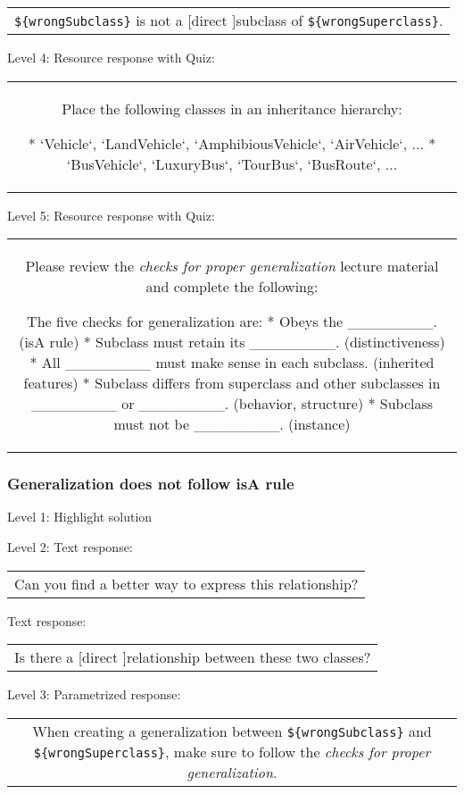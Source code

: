 \begin{tabular}{|c}
\verb|${wrongSubclass}| is not a [direct ]subclass of \verb|${wrongSuperclass}|.
\end{tabular} \medskip

\noindent Level 4: Resource response with Quiz:

\begin{tabular}{|c}
Place the following classes in an inheritance hierarchy:

* `Vehicle`, `LandVehicle`, `AmphibiousVehicle`, `AirVehicle`, ...
* `BusVehicle`, `LuxuryBus`, `TourBus`, `BusRoute`, ...
\end{tabular} \medskip

\noindent Level 5: Resource response with Quiz:

\begin{tabular}{|c}
Please review the \textit{checks for proper generalization} lecture material
and complete the following:

The five checks for generalization are:
* Obeys the ________. (isA rule)
* Subclass must retain its ________. (distinctiveness)
* All ________ must make sense in each subclass. (inherited features)
* Subclass differs from superclass and other subclasses in ________ or ________. 
(behavior, structure)
* Subclass must not be ________. (instance)
\end{tabular} \medskip


\subsubsection{Generalization does not follow isA rule}

\noindent Level 1: Highlight solution \medskip

\noindent Level 2: Text response: \medskip

\begin{tabular}{|c}
Can you find a better way to express this relationship?
\end{tabular} \medskip

Text response: \medskip

\begin{tabular}{|c}
Is there a [direct ]relationship between these two classes?
\end{tabular} \medskip

\noindent Level 3: Parametrized response: \medskip

\begin{tabular}{|c}
When creating a generalization between \verb|${wrongSubclass}| and \verb|${wrongSuperclass}|, make sure to follow the \textit{checks for proper generalization}.
\end{tabular} \medskip

